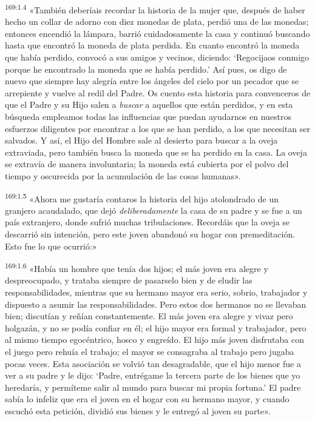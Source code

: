 \par 
\textsuperscript{169:1.4} «También deberíais recordar la historia de la mujer que, después de haber hecho un collar de adorno con diez monedas de plata, perdió una de las monedas; entonces encendió la lámpara, barrió cuidadosamente la casa y continuó buscando hasta que encontró la moneda de plata perdida. En cuanto encontró la moneda que había perdido, convocó a sus amigos y vecinos, diciendo: `Regocijaos conmigo porque he encontrado la moneda que se había perdido.' Así pues, os digo de nuevo que siempre hay alegría entre los ángeles del cielo por un pecador que se arrepiente y vuelve al redil del Padre. Os cuento esta historia para convenceros de que el Padre y su Hijo salen a \textit{buscar} a aquellos que están perdidos, y en esta búsqueda empleamos todas las influencias que puedan ayudarnos en nuestros esfuerzos diligentes por encontrar a los que se han perdido, a los que necesitan ser salvados. Y así, el Hijo del Hombre sale al desierto para buscar a la oveja extraviada, pero también busca la moneda que se ha perdido en la casa. La oveja se extravía de manera involuntaria; la moneda está cubierta por el polvo del tiempo y oscurecida por la acumulación de las cosas humanas».

\par 
\textsuperscript{169:1.5} «Ahora me gustaría contaros la historia del hijo atolondrado de un granjero acaudalado, que dejó \textit{deliberadamente} la casa de su padre y se fue a un país extranjero, donde sufrió muchas tribulaciones. Recordáis que la oveja se descarrió sin intención, pero este joven abandonó su hogar con premeditación. Esto fue lo que ocurrió:»

\par 
\textsuperscript{169:1.6} «Había un hombre que tenía dos hijos; el más joven era alegre y despreocupado, y trataba siempre de pasarselo bien y de eludir las responsabilidades, mientras que su hermano mayor era serio, sobrio, trabajador y dispuesto a asumir las responsabilidades. Pero estos dos hermanos no se llevaban bien; discutían y reñían constantemente. El más joven era alegre y vivaz pero holgazán, y no se podía confiar en él; el hijo mayor era formal y trabajador, pero al mismo tiempo egocéntrico, hosco y engreído. El hijo más joven disfrutaba con el juego pero rehuía el trabajo; el mayor se consagraba al trabajo pero jugaba pocas veces. Esta asociación se volvió tan desagradable, que el hijo menor fue a ver a su padre y le dijo: `Padre, entrégame la tercera parte de los bienes que yo heredaría, y permíteme salir al mundo para buscar mi propia fortuna.' El padre sabía lo infeliz que era el joven en el hogar con su hermano mayor, y cuando escuchó esta petición, dividió sus bienes y le entregó al joven su parte».

